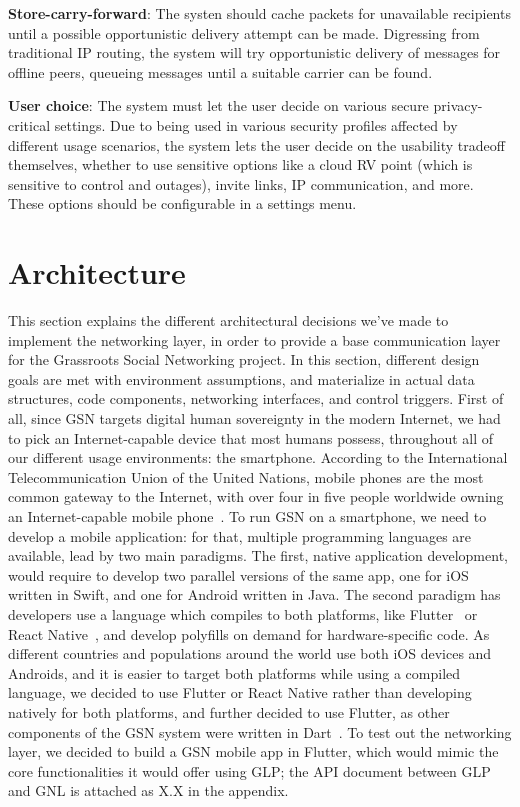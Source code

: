 \textbf{Store-carry-forward}: The systen should cache packets for unavailable recipients until a possible opportunistic delivery attempt can be made.
Digressing from traditional IP routing, the system will try opportunistic delivery of messages for offline peers, queueing messages until a suitable carrier can be found.

\textbf{User choice}: The system must let the user decide on various secure privacy-critical settings.
Due to being used in various security profiles affected by different usage scenarios, the system lets the user decide on the usability tradeoff themselves, whether to use sensitive options like a cloud RV point (which is sensitive to control and outages), invite links, IP communication, and more. These options should be configurable in a settings menu.

\section{Architecture}
\label{sec:arch}

This section explains the different architectural decisions we've made to implement the networking layer, in order to provide a base communication layer for the Grassroots Social Networking project. In this section, different design goals are met with environment assumptions, and materialize in actual data structures, code components, networking interfaces, and control triggers.
First of all, since GSN targets digital human sovereignty in the modern Internet, we had to pick an Internet-capable device that most humans possess, throughout all of our different usage environments: the smartphone. According to the International Telecommunication Union of the United Nations, mobile phones are the most common gateway to the Internet, with over four in five people worldwide owning an Internet-capable mobile phone~\cite{MobilePhoneOwnership}.
To run GSN on a smartphone, we need to develop a mobile application: for that, multiple programming languages are available, lead by two main paradigms. The first, native application development, would require to develop two parallel versions of the same app, one for iOS written in Swift, and one for Android written in Java. The second paradigm has developers use a language which compiles to both platforms, like Flutter~\cite{flutter} or React Native~\cite{RN}, and develop polyfills on demand for hardware-specific code. 
As different countries and populations around the world use both iOS devices and Androids, and it is easier to target both platforms while using a compiled language, we decided to use Flutter or React Native rather than developing natively for both platforms, and further decided to use Flutter, as other components of the GSN system were written in Dart~\cite{Shapiro2026GLP}.
To test out the networking layer, we decided to build a GSN mobile app in Flutter, which would mimic the core functionalities it would offer using GLP; the API document between GLP and GNL is attached as X.X in the appendix.

